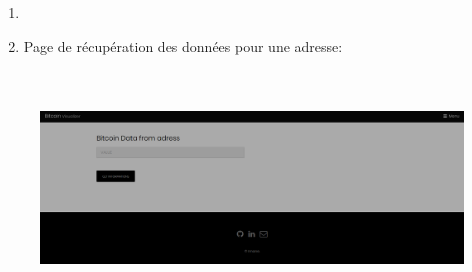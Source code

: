 \documentclass[12pt]{article}
\begin{document}
\begin{enumerate}
\begin{enumerate}
\begin{enumerate}
	\item \par

	\item Page de récupération des données pour une adresse:
\end{enumerate}
\end{enumerate}\par





\begin{figure}[H]
	\begin{Center}
		\includegraphics[width=6.69in,height=2.44in]{./media/image12.png}
	\end{Center}
\end{figure}




\par


\vspace{\baselineskip}

\vspace{\baselineskip}

\vspace{\baselineskip}

\vspace{\baselineskip}

\vspace{\baselineskip}

\vspace{\baselineskip}

\vspace{\baselineskip}

\vspace{\baselineskip}

\vspace{\baselineskip}

\vspace{\baselineskip}


\end{enumerate}
\end{document}

